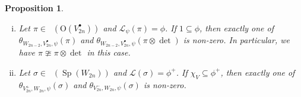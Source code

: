 \documentclass[article]{article}
\numberwithin{equation}{section}
\newtheorem{proposition}[theorem]{Proposition}
\theoremstyle{definition}
\DeclareMathOperator{\SP}{Sp}
\DeclareMathOperator{\Irrt}{Irr_{temp}}
\begin{document}
\begin{proposition}\label{1notinphi}
	\begin{enumerate}[(i)]
		\item Let $\pi \in \Irrt \left(\mathrm O(V^\bullet_{2n})\right)$ and $\mathcal L_{\psi}(\pi)=\phi$. If $\mathrm{1} \subseteq \phi$, then exactly one of $\theta_{W_{2n-2}, V_{2n}^{\bullet} ,\psi}(\pi)$ and $ \theta_{W_{2n-2}, V_{2n}^{\bullet} ,\psi}(\pi\otimes\det)$ is non-zero. In particular, we have $\pi\ncong \pi\otimes\det$ in this case. 
		\item Let $\sigma\in \Irrt \left(\SP(W_{2n})\right)$ and $\mathcal L(\sigma)=\phi^+$. If $\chi_{V}\subseteq \phi^+$, then exactly one of $\theta_{V^{+}_{2n},W_{2n},\psi}(\sigma)$ and $\theta_{V^{-}_{2n},W_{2n},\psi}(\sigma)$ is non-zero.  
	\end{enumerate}
\end{proposition}
\end{document}
